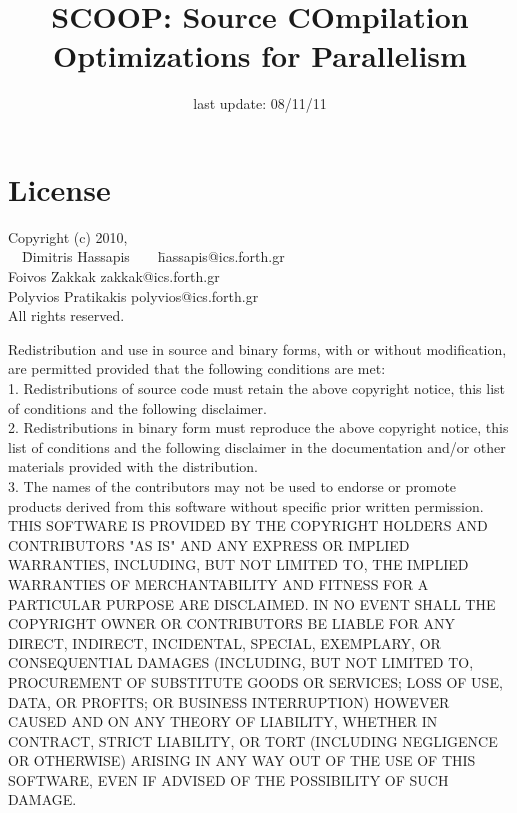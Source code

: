 \documentclass[letterpaper]{article}
\begin{document}
\title{SCOOP: Source COmpilation Optimizations for Parallelism \scoopversion}
\date{last update: 08/11/11}
\maketitle

\section{License}

\begin{tabbing}
Copyright (c) 2010,\\
\ \ \=Dimitris Hassapis\ \ \ \ \=hassapis@ics.forth.gr\\
\>Foivos Zakkak        \>zakkak@ics.forth.gr\\
\>Polyvios Pratikakis  \>polyvios@ics.forth.gr\\
All rights reserved.
\end{tabbing}

Redistribution and use in source and binary forms, with or without
modification, are permitted provided that the following conditions are
met:\\

1. Redistributions of source code must retain the above copyright
notice, this list of conditions and the following disclaimer.\\

2. Redistributions in binary form must reproduce the above copyright
notice, this list of conditions and the following disclaimer in the
documentation and/or other materials provided with the distribution.\\

3. The names of the contributors may not be used to endorse or promote
products derived from this software without specific prior written
permission.\\

THIS SOFTWARE IS PROVIDED BY THE COPYRIGHT HOLDERS AND CONTRIBUTORS "AS
IS" AND ANY EXPRESS OR IMPLIED WARRANTIES, INCLUDING, BUT NOT LIMITED
TO, THE IMPLIED WARRANTIES OF MERCHANTABILITY AND FITNESS FOR A
PARTICULAR PURPOSE ARE DISCLAIMED. IN NO EVENT SHALL THE COPYRIGHT OWNER
OR CONTRIBUTORS BE LIABLE FOR ANY DIRECT, INDIRECT, INCIDENTAL, SPECIAL,
EXEMPLARY, OR CONSEQUENTIAL DAMAGES (INCLUDING, BUT NOT LIMITED TO,
PROCUREMENT OF SUBSTITUTE GOODS OR SERVICES; LOSS OF USE, DATA, OR
PROFITS; OR BUSINESS INTERRUPTION) HOWEVER CAUSED AND ON ANY THEORY OF
LIABILITY, WHETHER IN CONTRACT, STRICT LIABILITY, OR TORT (INCLUDING
NEGLIGENCE OR OTHERWISE) ARISING IN ANY WAY OUT OF THE USE OF THIS
SOFTWARE, EVEN IF ADVISED OF THE POSSIBILITY OF SUCH DAMAGE.\\
\end{document}

